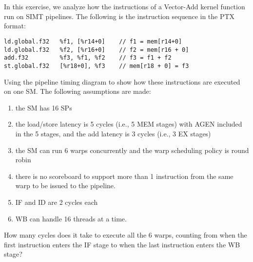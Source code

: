 \documentclass[11pt]{article}
\begin{document}
\section{}

In this exercise, we analyze how the instructions of a Vector-Add kernel function run on SIMT pipelines. The following is the instruction sequence in the PTX format:

\begin{verbatim}
ld.global.f32   %f1, [%r14+0]    // f1 = mem[r14+0]
ld.global.f32   %f2, [%r16+0]    // f2 = mem[r16 + 0]
add.f32         %f3, %f1, %f2    // f3 = f1 + f2
st.global.f32   [%r18+0], %f3    // mem[r18 + 0] = f3 
\end{verbatim}

Using the pipeline timing diagram to show how these instructions are executed on one SM. The following assumptions are made: 

\begin{enumerate}
	\item the SM has 16 SPs
	\item the load/store latency is 5 cycles (i.e., 5 MEM stages) with AGEN included in the 5 stages, and the add latency is 3 cycles (i.e., 3 EX stages)
	\item the SM can run 6 warps concurrently and the warp scheduling policy is round robin
	\item there is no scoreboard to support more than 1 instruction from the same warp to be issued to the pipeline. 
	\item IF and ID are 2 cycles each
	\item WB can handle 16 threads at a time.
\end{enumerate}

How many cycles does it take to execute all the 6 warps, counting from when the first instruction enters the IF stage to when the last instruction enters the WB stage?

\newpage
\end{document}
